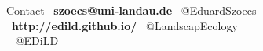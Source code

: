 \documentclass[final,t]{beamer}
\begin{document}
\begin{frame}{}
\begin{columns}[t]
\begin{column}{.48\linewidth}
    \begin{block}{Contact}
    \vskip -0.5cm
    \normalsize
    \faEnvelope ~\textbf{szoecs@uni-landau.de} \hfill  \faTwitter ~@EduardSzoecs \\[1ex]
    \faGlobe ~\textbf{http://edild.github.io/}   \hfill \faTwitter ~@LandscapEcology \\[1ex]
    \hfill \faGithub ~ @EDiLD 
    \vskip -0.5cm
    \end{block}

\end{column}
\end{columns}

\end{frame}
\end{document}
